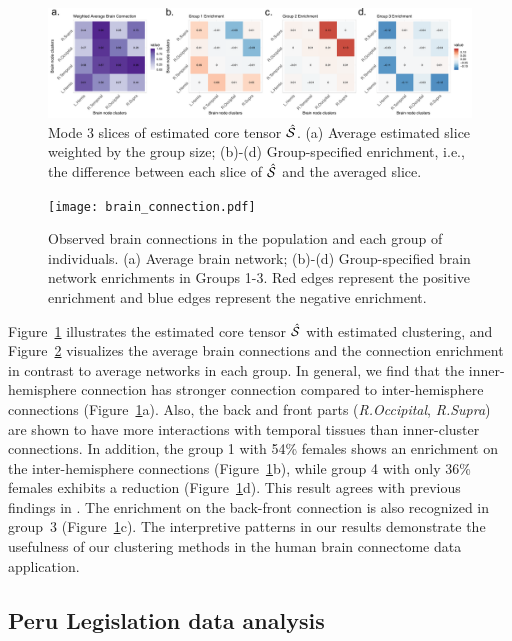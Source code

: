 \documentclass[journal]{IEEEtran}
\theoremstyle{definition}
\theoremstyle{definition}
\begin{document}
\begin{figure}[htb]
    \centering
    \includegraphics[width = 1\textwidth]{est_S_anno.pdf}
    \caption{Mode 3 slices of estimated core tensor $\hat {\mathcal{S}}$. (a) Average estimated slice weighted by the group size; (b)-(d) Group-specified enrichment, i.e., the difference between each slice of $\hat {\mathcal{S}}$ and the averaged slice. }
    \label{fig:ests}
\end{figure}

\begin{figure}[htb]
    \centering
    \texttt{[image: brain\_connection.pdf]}
    \caption{Observed brain connections in the population and each group of individuals. (a) Average brain network; (b)-(d) Group-specified brain network enrichments in Groups 1-3. Red edges represent the positive enrichment and blue edges represent the negative enrichment.}
    \label{fig:brain_conn}
\end{figure}

Figure~\ref{fig:ests} illustrates the estimated core tensor $\hat {\mathcal{S}}$ with estimated clustering, and Figure~\ref{fig:brain_conn} visualizes the average brain connections and the connection enrichment in contrast to average networks in each group. In general, we find that the inner-hemisphere connection has stronger connection compared to inter-hemisphere connections (Figure~\ref{fig:ests}a). Also, the back and front parts (\emph{R.Occipital}, \emph{R.Supra}) are shown to have more interactions with temporal tissues than inner-cluster connections. In addition, the group 1 with 54\% females shows an enrichment on the inter-hemisphere connections (Figure~\ref{fig:ests}b), while group 4 with only 36\% females exhibits a reduction (Figure~\ref{fig:ests}d). This result agrees with previous findings in \cite{hu2021generalized}. The enrichment on the back-front connection is also recognized in group~3 (Figure~\ref{fig:ests}c). The interpretive patterns in our results demonstrate the usefulness of our clustering methods in the human brain connectome data application. 

\subsection{Peru Legislation data analysis}
\end{document}
